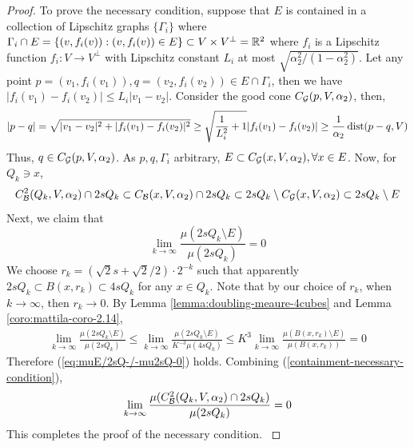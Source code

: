 \begin{proof}
    {\color{red}
    To prove the necessary condition, suppose that $E$ is contained in a collection of Lipschitz graphs $\{\Gamma_i\}$ where $\Gamma_i\cap E = \{(v, f_i(v)) : (v, f_i(v))\in E\}\subset V\times V^\perp = \mathbb{R}^2$ where $f_i$ is a Lipschitz function $f_i: V\rightarrow V^\perp$ with Lipschitz constant $L_i$ at most $\sqrt{\alpha_2^2/(1-\alpha_2^2)}$. Let any point $p = (v_1, f_i(v_1)), q = (v_2, f_i(v_2))\in E\cap \Gamma_i$, then we have $|f_i(v_1)-f_i(v_2)| \leq L_i |v_1- v_2|$. Consider the good cone $C_\mathcal G(p, V, \alpha_2)$, then, 
    \begin{align*}
        |p-q| = \sqrt{|v_1-v_2|^2 + |f_i(v_1) - f_i(v_2)|^2} 
        \geq \sqrt{\frac{1}{L_i^2} + 1} |f_i(v_1) - f_i(v_2)|  
        \geq \frac{1}{\alpha_2} \operatorname{dist}(p-q, V)
    \end{align*}
    Thus, $q\in C_\mathcal G(p, V, \alpha_2)$. As $p,q, \Gamma_i$ arbitrary, $E\subset C_\mathcal G(x, V, \alpha_2), \forall x\in E$. Now, for $Q_k\ni x$,
    \begin{equation}\label{containment-necessary-condition}
        C_\mathcal B^{2}(Q_k, V, \alpha_2)\cap 2sQ_k \subset C_\mathcal B(x,V, \alpha_2) \cap 2sQ_k \subset 2sQ_k \setminus C_\mathcal G(x, V, \alpha_2) \subset 2sQ_k \setminus E   
    \end{equation}
    Next, we claim that
    \begin{equation}\label{eq:muE/2sQ-/-mu2sQ-0}
        \lim_{k\rightarrow \infty}\frac{\mu(2sQ_k \setminus E)}{\mu(2sQ_k)} =0
    \end{equation}
    We choose $r_k = (\sqrt{2}s + \sqrt{2}/2) \cdot 2^{-k}$ such that apparently $2sQ_k\subset B(x,r_k)\subset 4sQ_k$ for any $x\in Q_k$. Note that by our choice of $r_k$, when $k\rightarrow\infty$, then $r_k\rightarrow 0$. By Lemma \ref{lemma:doubling-meaure-4cubes} and Lemma \ref{coro:mattila-coro-2.14},
    \begin{equation*}
        \begin{split}
            \lim_{k\rightarrow \infty} \frac{\mu(2sQ_k \setminus E)}{\mu(2sQ_k)} 
            \leq \lim_{k\rightarrow \infty} \frac{\mu(2sQ_k \setminus E)}{K^{-3}\mu(4sQ_k)} 
            \leq K^3 \lim_{k\rightarrow \infty} \frac{\mu(B(x, r_k) \setminus E)}{\mu(B(x, r_k))} = 
            0
        \end{split}
    \end{equation*}
    Therefore (\ref{eq:muE/2sQ-/-mu2sQ-0}) holds. Combining (\ref{containment-necessary-condition}),
    \begin{equation*}
        \lim_{k\rightarrow \infty}\frac{\mu(C_\mathcal B^{2}(Q_k, V, \alpha_2)\cap 2sQ_k)}{\mu(2sQ_k)} =0
    \end{equation*}
    This completes the proof of the necessary condition. 
    }
\end{proof}




